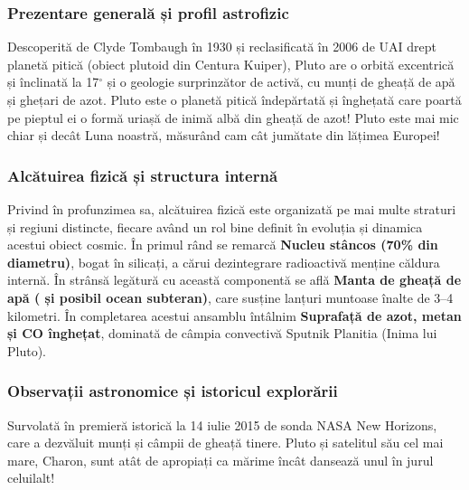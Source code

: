 \subsubsection*{Prezentare generală și profil astrofizic}
Descoperită de Clyde Tombaugh în 1930 și reclasificată în 2006 de UAI drept planetă pitică (obiect plutoid din Centura Kuiper), Pluto are o orbită excentrică și înclinată la 17$^\circ$ și o geologie surprinzător de activă, cu munți de gheață de apă și ghețari de azot. Pluto este o planetă pitică îndepărtată și înghețată care poartă pe pieptul ei o formă uriașă de inimă albă din gheață de azot! Pluto este mai mic chiar și decât Luna noastră, măsurând cam cât jumătate din lățimea Europei!

\subsubsection*{Alcătuirea fizică și structura internă}
Privind în profunzimea sa, alcătuirea fizică este organizată pe mai multe straturi și regiuni distincte, fiecare având un rol bine definit în evoluția și dinamica acestui obiect cosmic. În primul rând se remarcă \textbf{Nucleu stâncos (70\% din diametru)}, bogat în silicați, a cărui dezintegrare radioactivă menține căldura internă. În strânsă legătură cu această componentă se află \textbf{Manta de gheață de apă ( și posibil ocean subteran)}, care susține lanțuri muntoase înalte de 3--4 kilometri. În completarea acestui ansamblu întâlnim \textbf{Suprafață de azot, metan și CO înghețat}, dominată de câmpia convectivă Sputnik Planitia (\guillemotleft{}Inima lui Pluto\guillemotright{}).

\subsubsection*{Observații astronomice și istoricul explorării}
Survolată în premieră istorică la 14 iulie 2015 de sonda NASA New Horizons, care a dezvăluit munți și câmpii de gheață tinere. Pluto și satelitul său cel mai mare, Charon, sunt atât de apropiați ca mărime încât dansează unul în jurul celuilalt!

